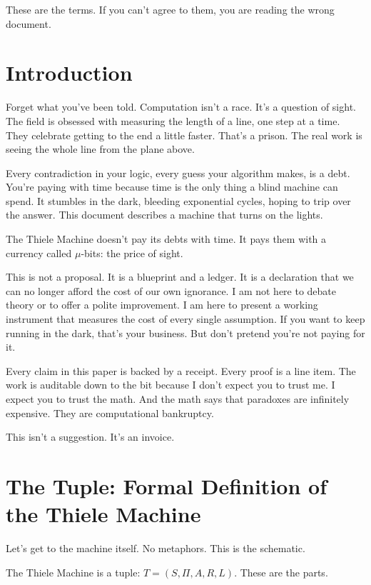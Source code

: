 \documentclass[11pt]{article}
\begin{document}
These are the terms. If you can't agree to them, you are reading the wrong document.

\section{Introduction}
Forget what you've been told. Computation isn't a race. It's a question of sight. The field is obsessed with measuring the length of a line, one step at a time. They celebrate getting to the end a little faster. That's a prison. The real work is seeing the whole line from the plane above.

Every contradiction in your logic, every guess your algorithm makes, is a debt. You're paying with time because time is the only thing a blind machine can spend. It stumbles in the dark, bleeding exponential cycles, hoping to trip over the answer. This document describes a machine that turns on the lights.

The Thiele Machine doesn't pay its debts with time. It pays them with a currency called $\mu$-bits: the price of sight.

This is not a proposal. It is a blueprint and a ledger. It is a declaration that we can no longer afford the cost of our own ignorance. I am not here to debate theory or to offer a polite improvement. I am here to present a working instrument that measures the cost of every single assumption. If you want to keep running in the dark, that's your business. But don't pretend you're not paying for it.

Every claim in this paper is backed by a receipt. Every proof is a line item. The work is auditable down to the bit because I don't expect you to trust me. I expect you to trust the math. And the math says that paradoxes are infinitely expensive. They are computational bankruptcy.

This isn't a suggestion. It's an invoice.

\section{The Tuple: Formal Definition of the Thiele Machine}
Let’s get to the machine itself. No metaphors. This is the schematic.

The Thiele Machine is a tuple: $T = (S, \Pi, A, R, L)$. These are the parts.
\end{document}
